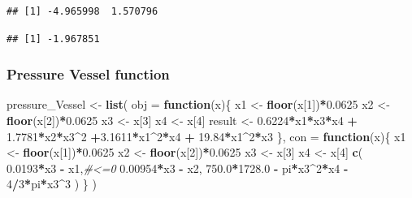 \documentclass[]{ctexbook}
\newenvironment{Shaded}{\begin{snugshade}}{\end{snugshade}}
\newcommand{\KeywordTok}[1]{\textcolor[rgb]{0.13,0.29,0.53}{\textbf{#1}}}
\newcommand{\DataTypeTok}[1]{\textcolor[rgb]{0.13,0.29,0.53}{#1}}
\newcommand{\DecValTok}[1]{\textcolor[rgb]{0.00,0.00,0.81}{#1}}
\newcommand{\FloatTok}[1]{\textcolor[rgb]{0.00,0.00,0.81}{#1}}
\newcommand{\StringTok}[1]{\textcolor[rgb]{0.31,0.60,0.02}{#1}}
\newcommand{\CommentTok}[1]{\textcolor[rgb]{0.56,0.35,0.01}{\textit{#1}}}
\newcommand{\ControlFlowTok}[1]{\textcolor[rgb]{0.13,0.29,0.53}{\textbf{#1}}}
\newcommand{\OperatorTok}[1]{\textcolor[rgb]{0.81,0.36,0.00}{\textbf{#1}}}
\newcommand{\NormalTok}[1]{#1}
\begin{document}
\begin{verbatim}
## [1] -4.965998  1.570796
\end{verbatim}

\begin{verbatim}
## [1] -1.967851
\end{verbatim}

\subsubsection{Pressure Vessel function}\label{pressure-vessel-function}

\begin{Shaded}
\begin{Highlighting}[]
\NormalTok{pressure_Vessel <-}\StringTok{ }\KeywordTok{list}\NormalTok{(}
\DataTypeTok{obj =} \ControlFlowTok{function}\NormalTok{(x)\{}
\NormalTok{  x1 <-}\StringTok{ }\KeywordTok{floor}\NormalTok{(x[}\DecValTok{1}\NormalTok{])}\OperatorTok{*}\FloatTok{0.0625}
\NormalTok{  x2 <-}\StringTok{ }\KeywordTok{floor}\NormalTok{(x[}\DecValTok{2}\NormalTok{])}\OperatorTok{*}\FloatTok{0.0625}
\NormalTok{  x3 <-}\StringTok{ }\NormalTok{x[}\DecValTok{3}\NormalTok{]}
\NormalTok{  x4 <-}\StringTok{ }\NormalTok{x[}\DecValTok{4}\NormalTok{]}
\NormalTok{  result <-}\StringTok{ }\FloatTok{0.6224}\OperatorTok{*}\NormalTok{x1}\OperatorTok{*}\NormalTok{x3}\OperatorTok{*}\NormalTok{x4 }\OperatorTok{+}\StringTok{ }\FloatTok{1.7781}\OperatorTok{*}\NormalTok{x2}\OperatorTok{*}\NormalTok{x3}\OperatorTok{^}\DecValTok{2} \OperatorTok{+}\FloatTok{3.1611}\OperatorTok{*}\NormalTok{x1}\OperatorTok{^}\DecValTok{2}\OperatorTok{*}\NormalTok{x4 }\OperatorTok{+}\StringTok{ }\FloatTok{19.84}\OperatorTok{*}\NormalTok{x1}\OperatorTok{^}\DecValTok{2}\OperatorTok{*}\NormalTok{x3}
\NormalTok{\},}
\DataTypeTok{con =} \ControlFlowTok{function}\NormalTok{(x)\{}
\NormalTok{  x1 <-}\StringTok{ }\KeywordTok{floor}\NormalTok{(x[}\DecValTok{1}\NormalTok{])}\OperatorTok{*}\FloatTok{0.0625}
\NormalTok{  x2 <-}\StringTok{ }\KeywordTok{floor}\NormalTok{(x[}\DecValTok{2}\NormalTok{])}\OperatorTok{*}\FloatTok{0.0625}
\NormalTok{  x3 <-}\StringTok{ }\NormalTok{x[}\DecValTok{3}\NormalTok{]}
\NormalTok{  x4 <-}\StringTok{ }\NormalTok{x[}\DecValTok{4}\NormalTok{]}
  \KeywordTok{c}\NormalTok{(}
    \FloatTok{0.0193}\OperatorTok{*}\NormalTok{x3 }\OperatorTok{-}\StringTok{ }\NormalTok{x1,}\CommentTok{#<=0}
    \FloatTok{0.00954}\OperatorTok{*}\NormalTok{x3 }\OperatorTok{-}\StringTok{ }\NormalTok{x2,}
    \FloatTok{750.0}\OperatorTok{*}\FloatTok{1728.0} \OperatorTok{-}\StringTok{ }\NormalTok{pi}\OperatorTok{*}\NormalTok{x3}\OperatorTok{^}\DecValTok{2}\OperatorTok{*}\NormalTok{x4 }\OperatorTok{-}\StringTok{ }\DecValTok{4}\OperatorTok{/}\DecValTok{3}\OperatorTok{*}\NormalTok{pi}\OperatorTok{*}\NormalTok{x3}\OperatorTok{^}\DecValTok{3}
\NormalTok{  )}
\NormalTok{\}}
\NormalTok{)}
\end{Highlighting}
\end{Shaded}
\end{document}
